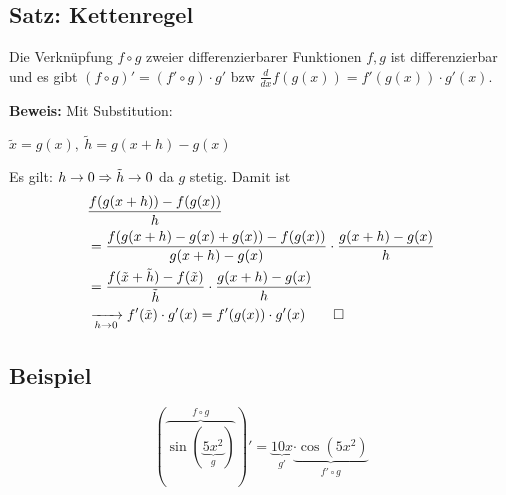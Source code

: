 \documentclass[10pt, a4paper, fleqn]{article}
\begin{document}
\subsection{Satz: Kettenregel}
Die Verknüpfung $f \circ g$ zweier differenzierbarer Funktionen $f, g$ ist differenzierbar und
es gibt $(f \circ g)' = (f' \circ g) \cdot g'$ bzw $\frac{d}{dx} f(g(x)) = f'(g(x)) \cdot g'(x)$.

\textbf{Beweis: } Mit Substitution:

$\tilde{x} = g(x), \ \tilde{h} = g(x + h) - g(x)$

Es gilt: $h \to 0 \Rightarrow \tilde{h} \to 0$ da $g$ stetig. Damit ist
\[\begin{aligned}
    &\frac{f(g(x + h)) - f(g(x))}{h} \\
    &= \frac{f(g(x + h) - g(x) + g(x)) - f(g(x))}{g(x + h) - g(x)} \cdot \frac{g(x + h) - g(x)}{h} \\
    &= \frac{f(\tilde{x} + \tilde{h}) - f(\tilde{x})}{\tilde{h}} \cdot \frac{g(x + h) - g(x)}{h} \\
    &\xrightarrow[h \to 0]{} f'(\tilde{x}) \cdot g'(x) = f'(g(x)) \cdot g'(x) \qed
\end{aligned}\]

\subsection{Beispiel}
\[
    (\overbrace{\sin (\underbrace{5x^2}_{g})}^{f \circ g})' = \underbrace{10x}_{g'} \underbrace{\cdot \cos(5x^2)}_{f' \circ g}
\]
\end{document}
